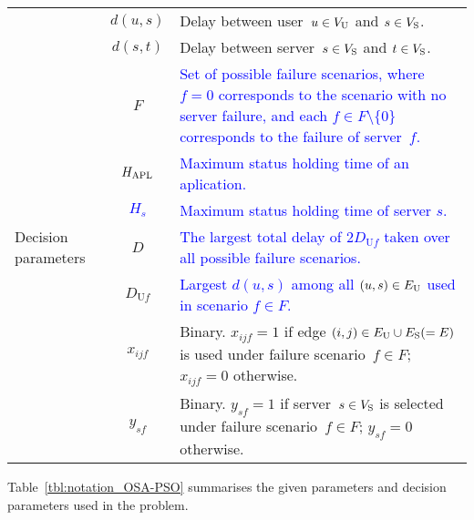 \documentclass[10pt, letterpaper]{IEEEtran}
\newcommand\blue[1]{\textcolor{blue}{#1}}
\begin{document}
\begin{CJK}{UTF8}{ipxm}
{\begin{table}[tb]
\begin{tabular}{p{1.3cm}|cp{5.4cm}}
        & $d(u,s)$ & Delay between user~$u \in V_{\rm{U}}$ and $s \in V_{\rm{S}}$. \\
        & $d(s,t)$ & Delay between server~$s \in V_{\rm{S}}$ and $t \in V_{\rm{S}}$. \\ 
        & $F$ & \blue{Set of possible failure scenarios, where $f = 0$ corresponds to the scenario with no server failure, and each $f \in F \setminus \{0\}$ corresponds to the failure of server~$f$.} \\
        & \blue{$H_{\rm APL}$} & \blue{Maximum status holding time of an aplication.} \\
        & \blue{$H_s$} & \blue{Maximum status holding time of server $s$.} \\ \hline
        Decision parameters & $D$ & \blue{The largest total delay of $2D_{\mathrm{U}f}$ taken over all possible failure scenarios.} \\
        & $D_{\mathrm{U}f}$ & \blue{Largest $d(u,s)$ among all $(u,s) \in E_{\rm{U}}$ used in scenario $f \in F$.} \\
        & $x_{ijf}$ & Binary. $x_{ijf} = 1$ if edge $(i,j) \in E_{\rm U} \cup E_{\rm S} (=E)$ is used under failure scenario~$f \in F$; $x_{ijf} = 0$ otherwise. \\
        & $y_{sf}$ & Binary. $y_{sf} = 1$ if server~$s \in V_{\rm{S}}$ is selected under failure scenario~$f \in F$; $y_{sf} = 0$ otherwise. \\ \hline
    \end{tabular}
\end{table}
Table~\ref{tbl:notation_OSA-PSO} summarises the given parameters and decision parameters used in the problem.
}


\end{CJK}
\end{document}
